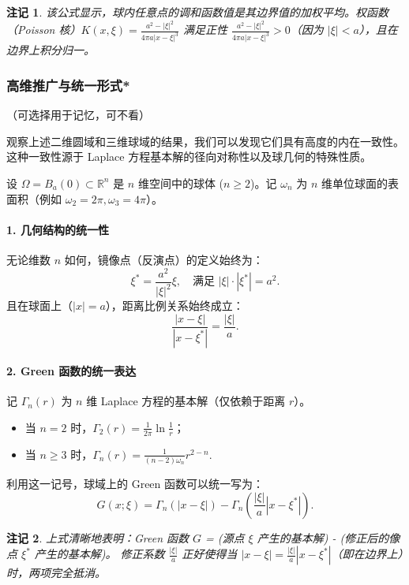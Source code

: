 \documentclass[12pt,a4paper]{ctexart}
\newtheorem*{note}{注记}
\begin{document}
	\begin{note}
		该公式显示，球内任意点的调和函数值是其边界值的加权平均。权函数（Poisson 核）$K(x, \xi) = \frac{a^2 - |\xi|^2}{4\pi a |x-\xi|^3}$ 满足正性 $\frac{a^2 - |\xi|^2}{4\pi a |x-\xi|^3} > 0$（因为 $|\xi| < a$），且在边界上积分归一。
	\end{note}
	
	\subsubsection{高维推广与统一形式*}（可选择用于记忆，可不看）
	
	观察上述二维圆域和三维球域的结果，我们可以发现它们具有高度的内在一致性。这种一致性源于 Laplace 方程基本解的径向对称性以及球几何的特殊性质。
	
	设 $\Omega = B_a(0) \subset \mathbb{R}^n$ 是 $n$ 维空间中的球体 ($n \ge 2$)。记 $\omega_n$ 为 $n$ 维单位球面的表面积（例如 $\omega_2 = 2\pi, \omega_3 = 4\pi$）。
	
	\paragraph{1. 几何结构的统一性}
	无论维数 $n$ 如何，镜像点（反演点）的定义始终为：
	\begin{equation}
		\xi^* = \frac{a^2}{|\xi|^2} \xi, \quad \text{满足 } |\xi| \cdot |\xi^*| = a^2.
	\end{equation}
	且在球面上（$|x|=a$），距离比例关系始终成立：
	\begin{equation}
		\frac{|x-\xi|}{|x-\xi^*|} = \frac{|\xi|}{a}.
	\end{equation}
	
	\paragraph{2. Green 函数的统一表达}
	记 $\Gamma_n(r)$ 为 $n$ 维 Laplace 方程的基本解（仅依赖于距离 $r$）。
	\begin{itemize}
		\item 当 $n=2$ 时，$\Gamma_2(r) = \frac{1}{2\pi} \ln \frac{1}{r}$；
		\item 当 $n \ge 3$ 时，$\Gamma_n(r) = \frac{1}{(n-2)\omega_n} r^{2-n}$.
	\end{itemize}
	利用这一记号，球域上的 Green 函数可以统一写为：
	\begin{equation}
		G(x; \xi) = \Gamma_n(|x-\xi|) - \Gamma_n\left( \frac{|\xi|}{a} |x-\xi^*| \right).
	\end{equation}
	\begin{note}
		上式清晰地表明：Green 函数 $G$ = (源点 $\xi$ 产生的基本解) - (修正后的像点 $\xi^*$ 产生的基本解)。
		修正系数 $\frac{|\xi|}{a}$ 正好使得当 $|x-\xi| = \frac{|\xi|}{a}|x-\xi^*|$（即在边界上）时，两项完全抵消。
	\end{note}
	
\end{document}
